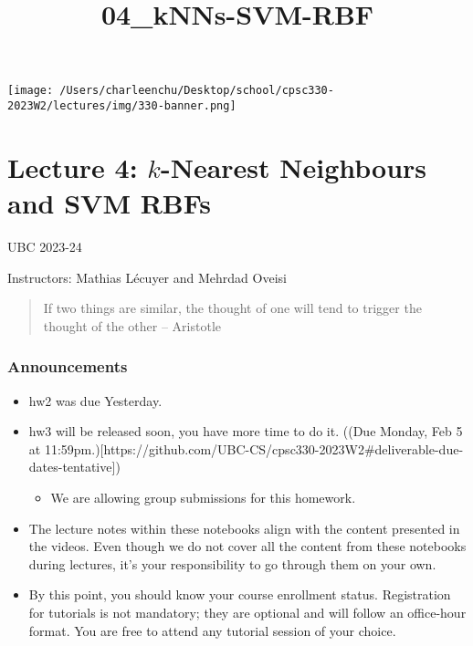 \documentclass[11pt]{article}
\title{04\_kNNs-SVM-RBF}
\providecommand{\tightlist}{%
      \setlength{\itemsep}{0pt}\setlength{\parskip}{0pt}}
\begin{document}
    
    \maketitle
    
    

    
    \texttt{[image: /Users/charleenchu/Desktop/school/cpsc330-2023W2/lectures/img/330-banner.png]}

    \section{\texorpdfstring{Lecture 4: \(k\)-Nearest Neighbours and SVM
RBFs}{Lecture 4: k-Nearest Neighbours and SVM RBFs}}\label{lecture-4-k-nearest-neighbours-and-svm-rbfs}

UBC 2023-24

Instructors: Mathias Lécuyer and Mehrdad Oveisi

\begin{quote}
If two things are similar, the thought of one will tend to trigger the
thought of the other -- Aristotle
\end{quote}

    \subsubsection{Announcements}\label{announcements}

\begin{itemize}
\tightlist
\item
  hw2 was due Yesterday.
\item
  hw3 will be released soon, you have more time to do it. ((Due Monday,
  Feb 5 at
  11:59pm.){[}https://github.com/UBC-CS/cpsc330-2023W2\#deliverable-due-dates-tentative{]})

  \begin{itemize}
  \tightlist
  \item
    We are allowing group submissions for this homework.
  \end{itemize}
\item
  The lecture notes within these notebooks align with the content
  presented in the videos. Even though we do not cover all the content
  from these notebooks during lectures, it's your responsibility to go
  through them on your own.
\item
  By this point, you should know your course enrollment status.
  Registration for tutorials is not mandatory; they are optional and
  will follow an office-hour format. You are free to attend any tutorial
  session of your choice.
\end{itemize}
\end{document}
